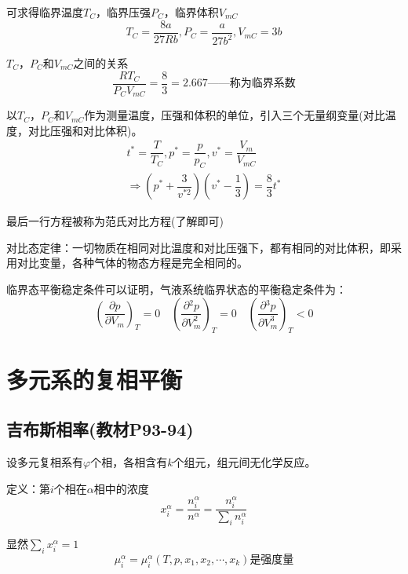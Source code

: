 \documentclass[oneside]{ctexbook}
\begin{document}
可求得临界温度\(T_C\)，临界压强\(P_C\)，临界体积\(V_{mC}\)
\begin{equation}
T_C=\dfrac{8a}{27Rb},P_C=\dfrac{a}{27b^2},V_{mC}=3b
\end{equation}

\(T_C\)，\(P_C\)和\(V_{mC}\)之间的关系
\begin{equation}
\dfrac{RT_C}{P_CV_{mC}}=\dfrac{8}{3}=2.667\text{——称为临界系数}
\end{equation}

以\(T_C\)，\(P_C\)和\(V_{mC}\)作为测量温度，压强和体积的单位，引入三个无量纲变量(对比温度，对比压强和对比体积)。
\begin{equation}
\begin{aligned}
    t^*=\dfrac{T}{T_C},p^*=\dfrac{p}{p_C},v^*=\dfrac{V_m}{V_{mC}}\\
    \Rightarrow{}\left(p^*+\dfrac{3}{v^{*2}}\right)\left(v^*-\dfrac{1}{3}\right)=\dfrac{8}{3}t^*
\end{aligned}
\end{equation}

最后一行方程被称为范氏对比方程(了解即可)

对比态定律：一切物质在相同对比温度和对比压强下，都有相同的对比体积，即采用对比变量，各种气体的物态方程是完全相同的。

临界态平衡稳定条件可以证明，气液系统临界状态的平衡稳定条件为：
\begin{equation}
\left(\dfrac{\partial{}p}{\partial{}V_m}\right)_T=0\quad\left(\dfrac{\partial{}^2p}{\partial{}V_m^2}\right)_T=0\quad\left(\dfrac{\partial{}^3p}{\partial{}V_m^3}\right)_T<0
\end{equation}

\chapter{多元系的复相平衡}

\section{吉布斯相率(教材P93-94)}

设多元复相系有\(\varphi\)个相，各相含有\(k\)个组元，组元间无化学反应。

定义：第\(i\)个相在\(\alpha\)相中的浓度
\begin{equation}
x_i^\alpha=\dfrac{n_i^\alpha}{n^\alpha}=\dfrac{n_i^\alpha}{\sum_in_i^\alpha}
\end{equation}

显然\(\sum_ix_i^\alpha=1\)
\begin{equation}
\mu_i^\alpha=\mu_i^\alpha(T,p,x_1,x_2,\cdots,x_k)\text{是强度量}
\end{equation}
\end{document}
